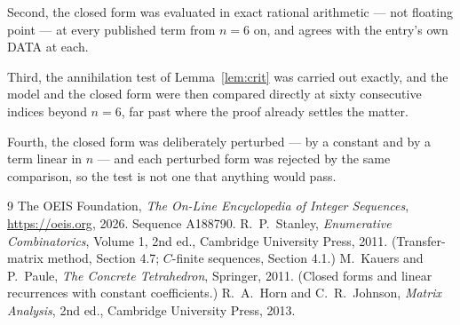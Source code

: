 \documentclass[11pt,a4paper]{article}
\theoremstyle{plain}
\theoremstyle{definition}
\begin{document}
Second, the closed form was evaluated in exact rational arithmetic --- not floating point ---
at every published term from $n=6$ on, and agrees with the entry's own DATA at each.

Third, the annihilation test of Lemma~\ref{lem:crit} was carried out exactly, and the model
and the closed form were then compared directly at sixty consecutive indices beyond
$n=6$, far past where the proof already settles the matter.

Fourth, the closed form was deliberately perturbed --- by a constant and by a term linear in
$n$ --- and each perturbed form was rejected by the same comparison, so the test is not one
that anything would pass.

\begin{thebibliography}{9}
 The OEIS Foundation, \emph{The On-Line Encyclopedia of Integer
Sequences}, \url{https://oeis.org}, 2026. Sequence A188790.
 R.~P.~Stanley, \emph{Enumerative Combinatorics}, Volume 1, 2nd ed.,
Cambridge University Press, 2011. (Transfer-matrix method, Section 4.7; $C$-finite sequences,
Section 4.1.)
 M.~Kauers and P.~Paule, \emph{The Concrete Tetrahedron}, Springer, 2011.
(Closed forms and linear recurrences with constant coefficients.)
 R.~A.~Horn and C.~R.~Johnson, \emph{Matrix Analysis}, 2nd ed., Cambridge
University Press, 2013.
\end{thebibliography}
\end{document}
